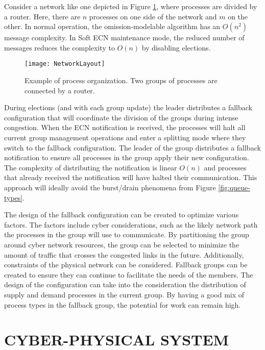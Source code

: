 Consider a network like one depicted in Figure \ref{fig:network-layout}, where processes are divided by a router.
Here, there are $n$ processes on one side of the network and $m$ on the other.
In normal operation, the omission-modelable algorithm has an $O(n^2)$ message complexity.
In Soft \ac{ECN} maintenance mode, the reduced number of messages reduces the complexity to $O(n)$ by disabling elections.

\begin{figure}[htbp]
\centering
\texttt{[image: NetworkLayout]}
\caption[Example of process organization.]{Example of process organization. Two groups of processes are connected by a router.} \label{fig:network-layout}
\end{figure}

During elections (and with each group update) the leader distributes a fallback configuration that will coordinate the division of the groups during intense congestion.
When the \ac{ECN} notification is received, the processes will halt all current group management operations and enter a splitting mode where they switch to the fallback configuration.
The leader of the group distributes a fallback notification to ensure all processes in the group apply their new configuration. 
The complexity of distributing the notification is linear $O(n)$ and processes that already received the notification will have halted their communication.
This approach will ideally avoid the burst/drain phenomena from Figure \ref{fig:queue-types}.

The design of the fallback configuration can be created to optimize various factors.
The factors include cyber considerations, such as the likely network path the processes in the group will use to communicate.
By partitioning the group around cyber network resources, the group can be selected to minimize the amount of traffic that crosses the congested links in the future.
Additionally, constraints of the physical network can be considered.
Fallback groups can be created to ensure they can continue to facilitate the needs of the members.
The design of the configuration can take into the consideration the distribution of supply and demand processes in the current group.
By having a good mix of process types in the fallback group, the potential for work can remain high.

\section{CYBER-PHYSICAL SYSTEM}

